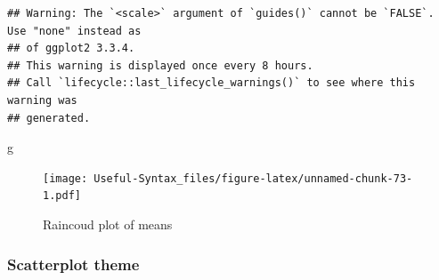 \documentclass[
]{article}
\newenvironment{Shaded}{\begin{snugshade}}{\end{snugshade}}
\newcommand{\NormalTok}[1]{#1}
\begin{document}
\begin{verbatim}
## Warning: The `<scale>` argument of `guides()` cannot be `FALSE`. Use "none" instead as
## of ggplot2 3.3.4.
## This warning is displayed once every 8 hours.
## Call `lifecycle::last_lifecycle_warnings()` to see where this warning was
## generated.
\end{verbatim}

\begin{Shaded}
\begin{Highlighting}[]
\NormalTok{g}
\end{Highlighting}
\end{Shaded}

\begin{figure}
\centering
\texttt{[image: Useful-Syntax\_files/figure-latex/unnamed-chunk-73-1.pdf]}
\caption{\label{fig:unnamed-chunk-73}Raincoud plot of means}
\end{figure}

\hypertarget{scatterplot-theme}{%
\subsubsection{Scatterplot theme}\label{scatterplot-theme}}
\end{document}
